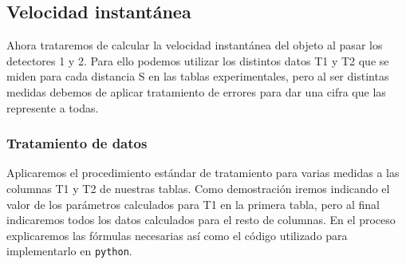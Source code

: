 \documentclass[12pt, a4paper, titlepage]{article}
\newcommand{\code}[1]{\texttt{#1}} %
\begin{document}
  \subsection{Velocidad instantánea}

  Ahora trataremos de calcular la velocidad instantánea del objeto al pasar los detectores 1 y 2. Para ello podemos utilizar los distintos datos T1 y T2 que se miden para cada distancia S en las tablas experimentales, pero al ser distintas medidas debemos de aplicar tratamiento de errores para dar una cifra que las represente a todas.

  \subsubsection{Tratamiento de datos}

  Aplicaremos el procedimiento estándar de tratamiento para varias medidas a las columnas T1 y T2 de nuestras tablas. Como demostración iremos indicando el valor de los parámetros calculados para T1 en la primera tabla, pero al final indicaremos todos los datos calculados para el resto de columnas. En el proceso explicaremos las fórmulas necesarias así como el código utilizado para implementarlo en \code{python}.
\end{document}
